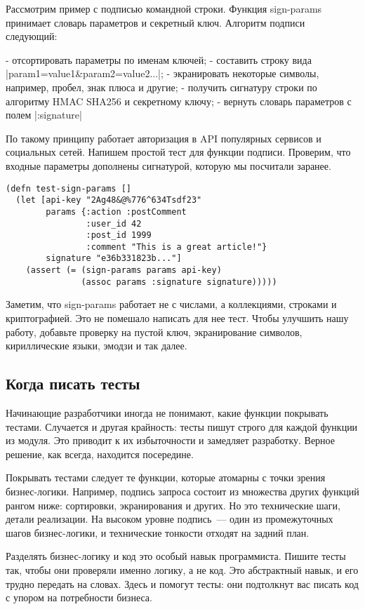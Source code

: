 Рассмотрим пример с подписью командной строки. Функция sign-params принимает
словарь параметров и секретный ключ. Алгоритм подписи следующий:

- отсортировать параметры по именам ключей;
- составить строку вида \spverb|param1=value1&param2=value2...|;
- экранировать некоторые символы, например, пробел, знак плюса и другие;
- получить сигнатуру строки по алгоритму HMAC SHA256 и секретному ключу;
- вернуть словарь параметров с полем \spverb|:signature|

По такому принципу работает авторизация в API популярных сервисов и социальных
сетей. Напишем простой тест для функции подписи. Проверим, что входные параметры
дополнены сигнатурой, которую мы посчитали заранее.

\begin{verbatim}
(defn test-sign-params []
  (let [api-key "2Ag48&@%776^634Tsdf23"
        params {:action :postComment
                :user_id 42
                :post_id 1999
                :comment "This is a great article!"}
        signature "e36b331823b..."]
    (assert (= (sign-params params api-key)
               (assoc params :signature signature)))))
\end{verbatim}

Заметим, что sign-params работает не с числами, а коллекциями, строками и
криптографией. Это не помешало написать для нее тест. Чтобы улучшить нашу
работу, добавьте проверку на пустой ключ, экранирование символов, кириллические
языки, эмодзи и так далее.

\subsection{Когда писать тесты}

Начинающие разработчики иногда не понимают, какие функции покрывать
тестами. Случается и другая крайность: тесты пишут строго для каждой функции из
модуля. Это приводит к их избыточности и замедляет разработку. Верное решение,
как всегда, находится посередине.

Покрывать тестами следует те функции, которые атомарны с точки зрения
бизнес-логики. Например, подпись запроса состоит из множества других функций
рангом ниже: сортировки, экранирования и других. Но это технические шаги, детали
реализации. На высоком уровне подпись~--- один из промежуточных шагов
бизнес-логики, и технические тонкости отходят на задний план.

Разделять бизнес-логику и код это особый навык программиста. Пишите тесты так,
чтобы они проверяли именно логику, а не код. Это абстрактный навык, и его трудно
передать на словах. Здесь и помогут тесты: они подтолкнут вас писать код с
упором на потребности бизнеса.

